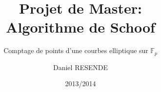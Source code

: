 \documentclass[12pt,a4paper]{book}
\begin{document}
\title{Projet de Master:\\ Algorithme de Schoof}
\subtitle{Comptage de points d'une courbes elliptique sur $\mathbb{F}_{p}$}
\author{Daniel RESENDE}
\date{2013/2014}

\maketitle


\tableofcontents

%

%

\nocite{*}


\end{document}
